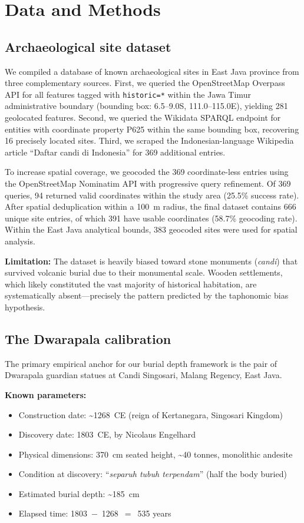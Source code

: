 \documentclass[12pt,a4paper]{article}
\begin{document}
\section{Data and Methods}

\subsection{Archaeological site dataset}

We compiled a database of known archaeological sites in East Java province from three complementary sources. First, we queried the OpenStreetMap Overpass API for all features tagged with \texttt{historic=*} within the Jawa Timur administrative boundary (bounding box: 6.5--9.0\textdegree{}S, 111.0--115.0\textdegree{}E), yielding 281 geolocated features. Second, we queried the Wikidata SPARQL endpoint for entities with coordinate property P625 within the same bounding box, recovering 16 precisely located sites. Third, we scraped the Indonesian-language Wikipedia article ``Daftar candi di Indonesia'' for 369 additional entries.

To increase spatial coverage, we geocoded the 369 coordinate-less entries using the OpenStreetMap Nominatim API with progressive query refinement. Of 369 queries, 94 returned valid coordinates within the study area (25.5\% success rate). After spatial deduplication within a 100~m radius, the final dataset contains 666 unique site entries, of which 391 have usable coordinates (58.7\% geocoding rate). Within the East Java analytical bounds, 383 geocoded sites were used for spatial analysis.

\textbf{Limitation:} The dataset is heavily biased toward stone monuments (\textit{candi}) that survived volcanic burial due to their monumental scale. Wooden settlements, which likely constituted the vast majority of historical habitation, are systematically absent---precisely the pattern predicted by the taphonomic bias hypothesis.

\subsection{The Dwarapala calibration}

The primary empirical anchor for our burial depth framework is the pair of Dwarapala guardian statues at Candi Singosari, Malang Regency, East Java.

\textbf{Known parameters:}
\begin{itemize}
  \item Construction date: \textasciitilde1268~CE (reign of Kertanegara, Singosari Kingdom)
  \item Discovery date: 1803~CE, by Nicolaus Engelhard
  \item Physical dimensions: 370~cm seated height, \textasciitilde40 tonnes, monolithic andesite
  \item Condition at discovery: ``\textit{separuh tubuh terpendam}'' (half the body buried)
  \item Estimated burial depth: \textasciitilde185~cm
  \item Elapsed time: 1803~$-$~1268~$=$~535 years
\end{itemize}
\end{document}

